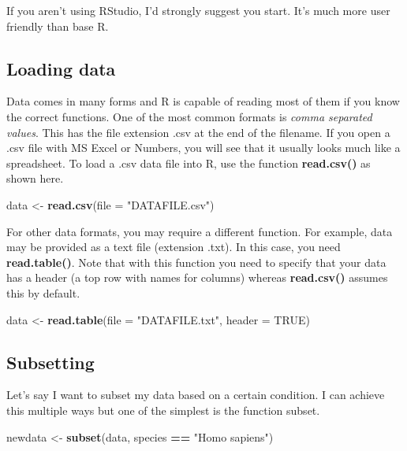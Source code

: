 \documentclass[
]{book}
\newenvironment{Shaded}{\begin{snugshade}}{\end{snugshade}}
\newcommand{\DataTypeTok}[1]{\textcolor[rgb]{0.13,0.29,0.53}{#1}}
\newcommand{\KeywordTok}[1]{\textcolor[rgb]{0.13,0.29,0.53}{\textbf{#1}}}
\newcommand{\NormalTok}[1]{#1}
\newcommand{\OperatorTok}[1]{\textcolor[rgb]{0.81,0.36,0.00}{\textbf{#1}}}
\newcommand{\OtherTok}[1]{\textcolor[rgb]{0.56,0.35,0.01}{#1}}
\newcommand{\StringTok}[1]{\textcolor[rgb]{0.31,0.60,0.02}{#1}}
\begin{document}
If you aren't using RStudio, I'd strongly suggest you start. It's much more user friendly than base R.

\hypertarget{loading-data}{%
\subsection{Loading data}\label{loading-data}}

Data comes in many forms and R is capable of reading most of them if you know the correct functions. One of the most common formats is \emph{comma separated values}. This has the file extension .csv at the end of the filename. If you open a .csv file with MS Excel or Numbers, you will see that it usually looks much like a spreadsheet. To load a .csv data file into R, use the function \textbf{read.csv()} as shown here.

\begin{Shaded}
\begin{Highlighting}[]
\NormalTok{data \textless{}{-}}\StringTok{ }\KeywordTok{read.csv}\NormalTok{(}\DataTypeTok{file =} \StringTok{"DATAFILE.csv"}\NormalTok{)}
\end{Highlighting}
\end{Shaded}

For other data formats, you may require a different function. For example, data may be provided as a text file (extension .txt). In this case, you need \textbf{read.table()}. Note that with this function you need to specify that your data has a header (a top row with names for columns) whereas \textbf{read.csv()} assumes this by default.

\begin{Shaded}
\begin{Highlighting}[]
\NormalTok{data \textless{}{-}}\StringTok{ }\KeywordTok{read.table}\NormalTok{(}\DataTypeTok{file =} \StringTok{"DATAFILE.txt"}\NormalTok{, }\DataTypeTok{header =} \OtherTok{TRUE}\NormalTok{)}
\end{Highlighting}
\end{Shaded}

\hypertarget{subsetting}{%
\subsection{Subsetting}\label{subsetting}}

Let's say I want to subset my data based on a certain condition. I can achieve this multiple ways but one of the simplest is the function subset.

\begin{Shaded}
\begin{Highlighting}[]
\NormalTok{newdata \textless{}{-}}\StringTok{ }\KeywordTok{subset}\NormalTok{(data, species }\OperatorTok{==}\StringTok{ "Homo sapiens"}\NormalTok{)}
\end{Highlighting}
\end{Shaded}
\end{document}
